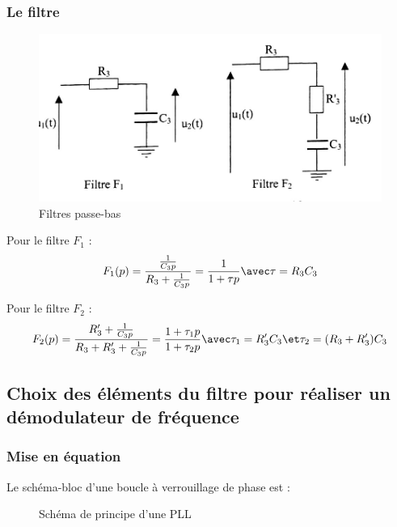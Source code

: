 \documentclass[../../Cours_M1.tex]{subfiles}
\begin{document}
\subsubsection{Le filtre}

\begin{figure}[h!]
\centering
\includegraphics[scale=0.5]{filtresPB.png}
\caption{Filtres passe-bas}
\end{figure}

Pour le filtre $F_1$ :
\[F_1(p) = \frac{\frac{1}{C_3p}}{R_3+\frac{1}{C_3p}} = \frac{1}{1+\tau p} \avec \tau = R_3C_3\]

Pour le filtre $F_2$ :
\[F_2(p) = \frac{R'_3+\frac{1}{C_3p}}{R_3+R'_3+\frac{1}{C_3p}} = \frac{1+\tau_1 p}{1+\tau_2 p} \avec \tau_1 = R'_3C_3 \et \tau_2 = (R_3+R'_3)C_3\]


\subsection{Choix des éléments du filtre pour réaliser un démodulateur de fréquence}

\subsubsection{Mise en équation}
Le schéma-bloc d'une boucle à verrouillage de phase est :

\begin{figure}[h!]
\centering
{}
\caption{Schéma de principe d'une PLL}
\end{figure}
\end{document}
